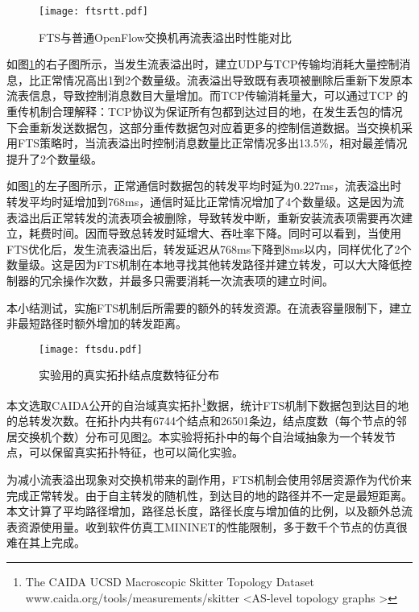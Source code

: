 \begin{figure}[!ht]
	\centering 
	\vspace{-1.5mm} 
	\texttt{[image: ftsrtt.pdf]}
	\caption{FTS与普通OpenFlow交换机再流表溢出时性能对比} \label{fig:ftsrtt}
\end{figure}

如图\ref{fig:ftsrtt}的右子图所示，当发生流表溢出时，建立UDP与TCP传输均消耗大量控制消息，比正常情况高出1到2个数量级。流表溢出导致既有表项被删除后重新下发原本流表信息，导致控制消息数目大量增加。而TCP传输消耗量大，可以通过TCP 的重传机制合理解释：TCP协议为保证所有包都到达过目的地，在发生丢包的情况下会重新发送数据包，这部分重传数据包对应着更多的控制信道数据。当交换机采用FTS策略时，当流表溢出时控制消息数量比正常情况多出13.5\%，相对最差情况提升了2个数量级。

如图\ref{fig:ftsrtt}的左子图所示，正常通信时数据包的转发平均时延为0.227ms，流表溢出时转发平均时延增加到768ms，通信时延比正常情况增加了4个数量级。这是因为流表溢出后正常转发的流表项会被删除，导致转发中断，重新安装流表项需要再次建立，耗费时间。因而导致总转发时延增大、吞吐率下降。同时可以看到，当使用FTS优化后，发生流表溢出后，转发延迟从768ms下降到8ms以内，同样优化了2个数量级。这是因为FTS机制在本地寻找其他转发路径并建立转发，可以大大降低控制器的冗余操作次数，并最多只需要消耗一次流表项的建立时间。


本小结测试，实施FTS机制后所需要的额外的转发资源。在流表容量限制下，建立非最短路径时额外增加的转发距离。

\begin{figure}[!ht]
	\centering 
	\vspace{-1.5mm} 
	\texttt{[image: ftsdu.pdf]}
	\caption{实验用的真实拓扑结点度数特征分布} \label{fig:ftsdu}
\end{figure}

本文选取CAIDA公开的自治域真实拓扑\footnote{The CAIDA UCSD Macroscopic Skitter Topology Dataset  www.caida.org/tools/measurements/skitter <AS-level topology graphs > }数据，统计FTS机制下数据包到达目的地的总转发次数。在拓扑内共有6744个结点和26501条边，结点度数（每个节点的邻居交换机个数）分布可见图\ref{fig:ftsdu}。本实验将拓扑中的每个自治域抽象为一个转发节点，可以保留真实拓扑特征，也可以简化实验。

为减小流表溢出现象对交换机带来的副作用，FTS机制会使用邻居资源作为代价来完成正常转发。由于自主转发的随机性，到达目的地的路径并不一定是最短距离。本文计算了平均路径增加，路径总长度，路径长度与增加值的比例，以及额外总流表资源使用量。收到软件仿真工MININET的性能限制，多于数千个节点的仿真很难在其上完成。

